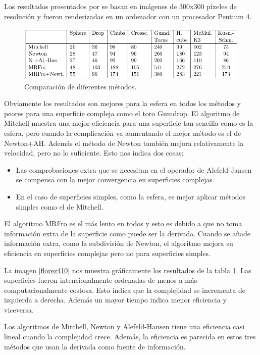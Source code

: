 \begin{remark}
Los resultados presentados por \cite{Florez08} se basan en imágenes de 300x300 píxeles de resolución  y fueron renderizadas en un ordenador con un procesador Pentium 4.
\end{remark}

\begin{figure}[h]
	\centering
	\includegraphics[scale=0.5]{images/florez7.png}
	\caption{Comparación de diferentes métodos.}
	\label{florez41}
\end{figure}

Obviamente los resultados son mejores para la esfera en todos los métodos y peores para una superficie compleja como el toro Gumdrop. El algoritmo de Mitchell muestra una mejor eficiencia para una superficie tan sencilla como es la esfera, pero cuando la complicación va aumentando el mejor método es el de Newton+AH. Además el método de Newton también mejora relativamente la velocidad, pero no lo suficiente. Esto nos indica dos cosas:
\begin{itemize}
\item Las comprobaciones extra que se necesitan en el operador de Alefeld-Jansen se compensa con la mejor convergencia en superficies complejas.
\item En el caso de superficies simples, como la esfera, es mejor aplicar métodos simples como el de Mitchell.
\end{itemize}

El algoritmo MRFro es el más lento en todos y esto es debido a que no toma información extra de la superficie como puede ser la derivada. Cuando se añade información extra, como la subdivisión de Newton, el algoritmo mejora su eficiencia en superficies complejas pero no para superficies simples.

La imagen \ref{florez410} nos muestra gráficamente los resultados de la tabla \ref{florez41}.  Las superficies fueron intencionalmente ordenadas de menos a más computacionalmente costosa.  Esto indica que la complejidad se incrementa de izquierda a derecha. Además un mayor tiempo indica menor eficiencia y viceversa.

Los algoritmos de Mitchell, Newton y Alefeld-Hansen tiene una eficiencia casi lineal cuando la complejidad crece. Además, la eficiencia es parecida en estos tres métodos que usan la derivada como fuente de información.

